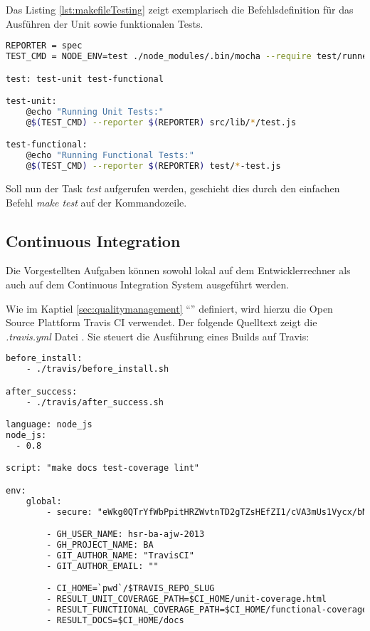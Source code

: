 Das Listing \ref{lst:makefileTesting} zeigt exemplarisch die Befehlsdefinition für das Ausführen der Unit sowie funktionalen Tests.

\begin{lstlisting}[language=Bash, caption=Ausschnitt Makefile: Testing \cite{RoomiesMakefile}, label=lst:makefileTesting]
REPORTER = spec
TEST_CMD = NODE_ENV=test ./node_modules/.bin/mocha --require test/runner.js --globals config

test: test-unit test-functional

test-unit:
	@echo "Running Unit Tests:"
	@$(TEST_CMD) --reporter $(REPORTER) src/lib/*/test.js

test-functional:
	@echo "Running Functional Tests:"
	@$(TEST_CMD) --reporter $(REPORTER) test/*-test.js
\end{lstlisting}

Soll nun der Task \emph{test} aufgerufen werden, geschieht dies durch den einfachen Befehl \emph{make test} auf der Kommandozeile.


\subsection*{Continuous Integration}
Die Vorgestellten Aufgaben können sowohl lokal auf dem Entwicklerrechner als auch auf dem Continuous Integration System ausgeführt werden.

Wie im Kaptiel \ref{sec:qualitymanagement} ``'' definiert, wird hierzu die Open Source Plattform Travis CI \cite{TravisCI} verwendet. Der folgende Quelltext zeigt die \emph{.travis.yml} Datei \cite{RoomiesTravisYML}. Sie steuert die Ausführung eines Builds auf Travis:

\begin{lstlisting}[language=XML, caption=.travis.yml \cite{RoomiesTravisYML}, label=lst:roomiesTravisYML]
before_install:
    - ./travis/before_install.sh

after_success:
    - ./travis/after_success.sh

language: node_js
node_js:
  - 0.8

script: "make docs test-coverage lint"

env:
    global:
        - secure: "eWkg0QTrYfWbPpitHRZWvtnTD2gTZsHEfZI1/cVA3mUs1Vycx/bNHzAt4fNm\nWR7EsTkaNLkc6p3JA797kwIyCugt+0D2tTdn7ra532Gye9u/KGjJB38HuJ0A\nQxibB+ahyAOJL+NjRNAQsME2lFmNv950/4sRbXYybijxJD6fqcw="

        - GH_USER_NAME: hsr-ba-ajw-2013
        - GH_PROJECT_NAME: BA
        - GIT_AUTHOR_NAME: "TravisCI"
        - GIT_AUTHOR_EMAIL: ""

        - CI_HOME=`pwd`/$TRAVIS_REPO_SLUG
        - RESULT_UNIT_COVERAGE_PATH=$CI_HOME/unit-coverage.html
        - RESULT_FUNCTIIONAL_COVERAGE_PATH=$CI_HOME/functional-coverage.html
        - RESULT_DOCS=$CI_HOME/docs
\end{lstlisting}

